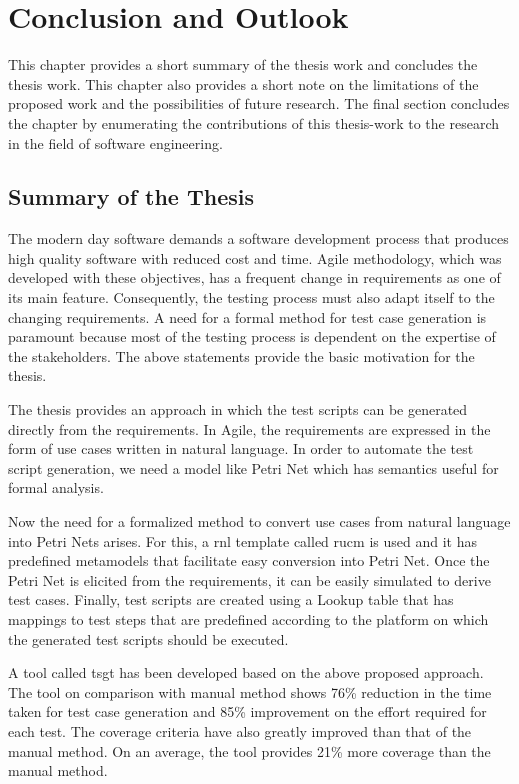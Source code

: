 
\chapter{Conclusion and Outlook}\label{conclusion} 
This chapter provides a short summary of the thesis work and concludes the thesis work. This chapter also provides a short note on the limitations of the proposed work and the possibilities of future research. The final section concludes the chapter by enumerating the contributions of this thesis-work to the research in the field of software engineering.

\section{Summary of the Thesis}
The modern day software demands a software development process that produces high quality software with reduced cost and time.  Agile methodology, which was developed with these objectives, has a frequent change in requirements as one of its main feature. Consequently, the testing process must also adapt itself to the changing requirements. A need for a formal method for test case generation is paramount because most of the testing process is dependent on the expertise of the stakeholders. The above statements provide the basic motivation for the thesis.

The thesis provides an approach in which the test scripts can be generated directly from the requirements. In Agile, the requirements are expressed in the form of use cases written in natural language. In order to automate the test script generation, we need a model like Petri Net which has semantics useful for formal analysis. 

Now the need for a formalized method to convert use cases from natural language into Petri Nets arises. For this, a \gls{rnl} template called \gls{rucm} is used and it has predefined metamodels that facilitate easy conversion into Petri Net. Once the Petri Net is elicited from the requirements, it can be easily simulated to derive test cases. Finally, test scripts are created using a Lookup table that has mappings to test steps that are predefined according to the platform on which the generated test scripts should be executed. 

A tool called \gls{tsgt} has been developed based on the above proposed approach. The tool on comparison with manual method shows 76\% reduction in the time taken for test case generation and 85\% improvement on the effort required for each test. The coverage criteria have also greatly improved than that of the manual method. On an average, the tool provides 21\% more coverage than the manual method.

